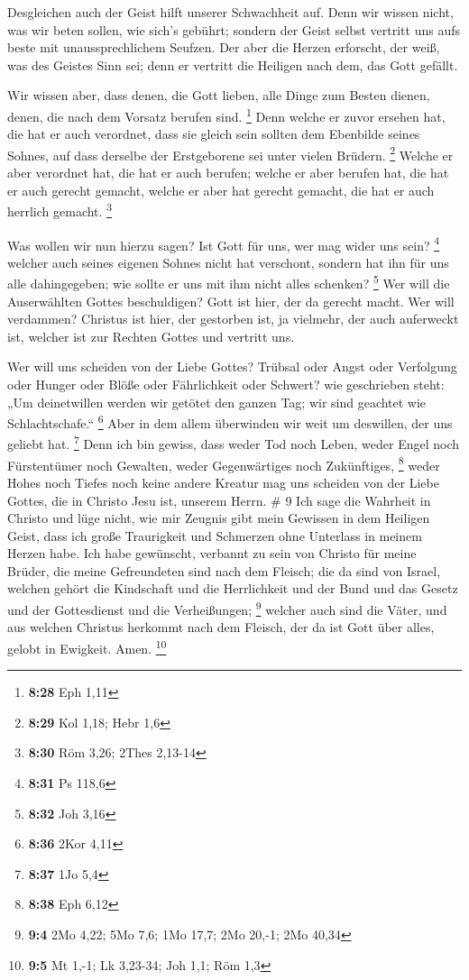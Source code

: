  Desgleichen auch der Geist hilft unserer Schwachheit
auf. Denn wir wissen nicht, was wir beten sollen, wie sich's gebührt;
sondern der Geist selbst vertritt uns aufs beste mit unaussprechlichem
Seufzen.  Der aber die Herzen erforscht, der weiß, was
des Geistes Sinn sei; denn er vertritt die Heiligen nach dem, das Gott
gefällt.

 Wir wissen aber, dass denen, die Gott lieben, alle Dinge
zum Besten dienen, denen, die nach dem Vorsatz berufen sind. \footnote{\textbf{8:28}
  Eph 1,11}  Denn welche er zuvor ersehen hat, die hat er
auch verordnet, dass sie gleich sein sollten dem Ebenbilde seines
Sohnes, auf dass derselbe der Erstgeborene sei unter vielen Brüdern.
\footnote{\textbf{8:29} Kol 1,18; Hebr 1,6}  Welche er
aber verordnet hat, die hat er auch berufen; welche er aber berufen hat,
die hat er auch gerecht gemacht, welche er aber hat gerecht gemacht, die
hat er auch herrlich gemacht. \footnote{\textbf{8:30} Röm 3,26; 2Thes
  2,13-14}

 Was wollen wir nun hierzu sagen? Ist Gott für uns, wer
mag wider uns sein? \footnote{\textbf{8:31} Ps 118,6} 
welcher auch seines eigenen Sohnes nicht hat verschont, sondern hat ihn
für uns alle dahingegeben; wie sollte er uns mit ihm nicht alles
schenken? \footnote{\textbf{8:32} Joh 3,16}  Wer will die
Auserwählten Gottes beschuldigen? Gott ist hier, der da gerecht macht.
 Wer will verdammen? Christus ist hier, der gestorben
ist, ja vielmehr, der auch auferweckt ist, welcher ist zur Rechten
Gottes und vertritt uns.

 Wer will uns scheiden von der Liebe Gottes? Trübsal oder
Angst oder Verfolgung oder Hunger oder Blöße oder Fährlichkeit oder
Schwert?  wie geschrieben steht: „Um deinetwillen werden
wir getötet den ganzen Tag; wir sind geachtet wie Schlachtschafe.``
\footnote{\textbf{8:36} 2Kor 4,11}  Aber in dem allem
überwinden wir weit um deswillen, der uns geliebt hat. \footnote{\textbf{8:37}
  1Jo 5,4}  Denn ich bin gewiss, dass weder Tod noch
Leben, weder Engel noch Fürstentümer noch Gewalten, weder Gegenwärtiges
noch Zukünftiges, \footnote{\textbf{8:38} Eph 6,12} 
weder Hohes noch Tiefes noch keine andere Kreatur mag uns scheiden von
der Liebe Gottes, die in Christo Jesu ist, unserem Herrn. \# 9
 Ich sage die Wahrheit in Christo und lüge nicht, wie mir
Zeugnis gibt mein Gewissen in dem Heiligen Geist,  dass
ich große Traurigkeit und Schmerzen ohne Unterlass in meinem Herzen
habe.  Ich habe gewünscht, verbannt zu sein von Christo
für meine Brüder, die meine Gefreundeten sind nach dem Fleisch;
 die da sind von Israel, welchen gehört die Kindschaft und
die Herrlichkeit und der Bund und das Gesetz und der Gottesdienst und
die Verheißungen; \footnote{\textbf{9:4} 2Mo 4,22; 5Mo 7,6; 1Mo 17,7;
  2Mo 20,-1; 2Mo 40,34}  welcher auch sind die Väter, und
aus welchen Christus herkommt nach dem Fleisch, der da ist Gott über
alles, gelobt in Ewigkeit. Amen. \footnote{\textbf{9:5} Mt 1,-1; Lk
  3,23-34; Joh 1,1; Röm 1,3}

